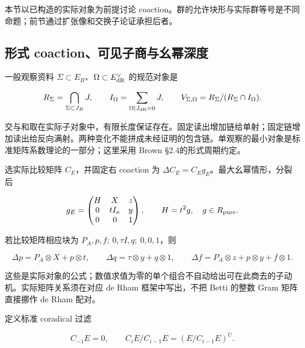 \documentclass[11pt,a4paper,oneside]{ctexart}
\theoremstyle{cnplain}
\theoremstyle{definition}
\theoremstyle{remark}
\numberwithin{equation}{section}
\begin{document}
\endgroup



\begingroup

本节以已构造的实际对象为前提讨论 coaction。群的允许块形与实际群等号是不同命题；前节通过扩张像和交换子论证承担后者。

\subsection{形式 coaction、可见子商与幺幂深度}\label{sec:coaction:9}

一般观察资料 \(\Sigma\subset E_B\)、\(\Omega\subset E_{\rm dR}^\vee\) 的规范对象是

\begin{equation}
R_\Sigma=\bigcap_{\Sigma\subset J_B}J,\qquad
 I_\Omega=\sum_{\Omega|J_{\rm dR}=0}J,\qquad
 V_{\Sigma,\Omega}=R_\Sigma/(R_\Sigma\cap I_\Omega).     \label{eq:coaction:9.1}
\end{equation}

交与和取在实际子对象中，有限长度保证存在。固定读出增加链给单射；固定链增加读出给反向满射。两种变化不能拼成未经证明的包含链。单观察的最小对象是标准矩阵系数理论的一部分；这里采用 Brown §2.4的形式周期约定。\cite{brownperiods}

选实际比较矩阵 \(C_E\)，并固定右 coaction 为 \(\Delta C_E=C_Eg_E\)。最大幺幂情形，分裂后

\begin{equation}
g_E=\begin{pmatrix}H&X&z\\0&tI_\kappa&y\\0&0&1\end{pmatrix},
 \qquad H=t^2g,\quad g\in R_{\rm pure}.
\end{equation}

若比较矩阵相应块为 \(P_A,p,f;\ 0,\tau I,q;\ 0,0,1\)，则

\begin{equation}
\Delta p=P_A\otimes X+p\otimes t,\qquad
 \Delta q=\tau\otimes y+q\otimes1,\qquad
 \Delta f=P_A\otimes z+p\otimes y+f\otimes1.              \label{eq:coaction:9.2}
\end{equation}

这些是实际对象的公式；数值求值为零的单个组合不自动给出可在此商去的子动机。实际矩阵关系须在对应 de Rham 框架中写出，不把 Betti 的整数 Gram 矩阵直接挪作 de Rham 配对。

定义标准 coradical 过滤

\begin{equation}
C_{-1}E=0,\qquad C_iE/C_{i-1}E=(E/C_{i-1}E)^U.
\end{equation}
\end{document}
